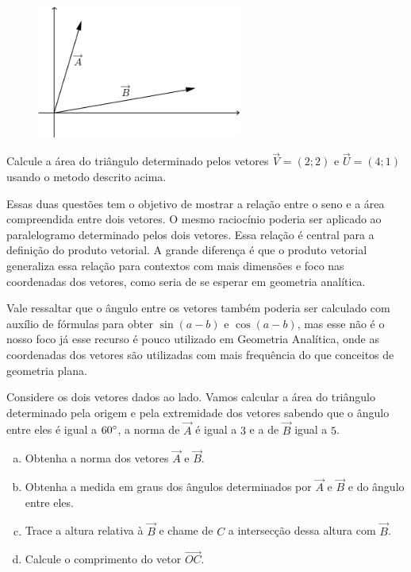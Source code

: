 \documentclass[main_estudante.tex]{subfiles}
\begin{document}
\begin{figure}[h]
\centering
\includegraphics[width=0.6\textwidth]{./img/c4q8.png}
\end{figure}

\begin{questao}
Calcule a área do triângulo determinado pelos vetores $\overrightarrow{V}=(2;2)$ e $\overrightarrow{U}=(4;1)$ usando o metodo descrito acima.
\end{questao}

Essas duas questões tem o objetivo de mostrar a relação entre o seno e a área compreendida entre dois vetores. O mesmo raciocínio poderia ser aplicado ao paralelogramo determinado pelos dois vetores. Essa relação é central para a definição do produto vetorial. A grande diferença é que o produto vetorial generaliza essa relação para contextos com mais dimensões e foco nas coordenadas dos vetores, como seria de se esperar em geometria analítica.

Vale ressaltar que o ângulo entre os vetores também poderia ser calculado com auxílio de fórmulas para obter $\sin(a-b)$ e $\cos(a-b)$, mas esse não é o nosso foco já esse recurso é pouco utilizado em Geometria Analítica, onde as coordenadas dos vetores são utilizadas com mais frequência do que conceitos de geometria plana.

\begin{questao}
Considere os dois vetores dados ao lado. Vamos calcular a área do triângulo determinado pela origem e pela extremidade dos vetores sabendo que o ângulo entre eles é igual a $60\degree$, a norma de $\overrightarrow{A}$ é igual a $3$ e a de $\overrightarrow{B}$ igual a $5$.
\begin{enumerate}[a)]
\item Obtenha a norma dos vetores $\overrightarrow{A}$ e $\overrightarrow{B}$.
\item Obtenha a medida em graus dos ângulos determinados por $\overrightarrow{A}$ e $\overrightarrow{B}$ e do ângulo entre eles.
\item Trace a altura relativa à $\overrightarrow{B}$ e chame de $C$ a intersecção dessa altura com $\overrightarrow{B}$.
\item Calcule o comprimento do vetor $\overrightarrow{OC}$.
\end{enumerate}
\end{questao}
\end{document}
